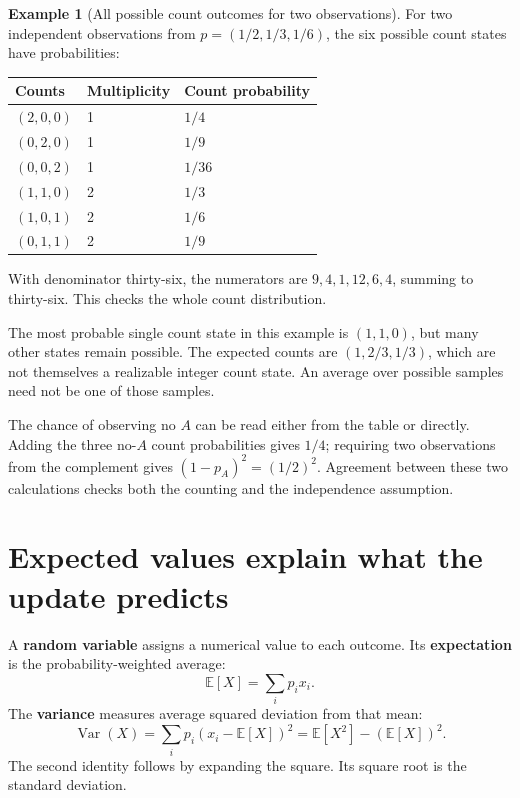\documentclass[11pt,oneside,openany]{book}
\theoremstyle{definition}
\newtheorem{example}{Example}[chapter]
\theoremstyle{remark}
\numberwithin{equation}{chapter}
\begin{document}
\begin{example}[All possible count outcomes for two observations]

For two independent observations from \(p=(1/2,1/3,1/6)\), the six possible count states have probabilities:

\begin{longtable}[]{@{}lll@{}}
\toprule\noalign{}
Counts & Multiplicity & Count probability \\
\midrule\noalign{}
\endhead
\bottomrule\noalign{}
\endlastfoot
\((2,0,0)\) & 1 & \(1/4\) \\
\((0,2,0)\) & 1 & \(1/9\) \\
\((0,0,2)\) & 1 & \(1/36\) \\
\((1,1,0)\) & 2 & \(1/3\) \\
\((1,0,1)\) & 2 & \(1/6\) \\
\((0,1,1)\) & 2 & \(1/9\) \\
\end{longtable}

With denominator thirty-six, the numerators are \(9,4,1,12,6,4\), summing to thirty-six. This checks the whole count distribution.

\end{example}

The most probable single count state in this example is \((1,1,0)\), but many other states remain possible. The expected counts are \((1,2/3,1/3)\), which are not themselves a realizable integer count state. An average over possible samples need not be one of those samples.

The chance of observing no \(A\) can be read either from the table or directly. Adding the three no-\(A\) count probabilities gives \(1/4\); requiring two observations from the complement gives \((1-p_A)^2=(1/2)^2\). Agreement between these two calculations checks both the counting and the independence assumption.

\section{Expected values explain what the update predicts}\label{ch04-expected-values-explain-what-the-update-predicts}

A \textbf{random variable} assigns a numerical value to each outcome. Its \textbf{expectation} is the probability-weighted average: \[\mathbb E[X]=\sum_i p_ix_i.\] The \textbf{variance} measures average squared deviation from that mean: \[\operatorname{Var}(X)=\sum_i p_i(x_i-\mathbb E[X])^2
=\mathbb E[X^2]-(\mathbb E[X])^2.\] The second identity follows by expanding the square. Its square root is the standard deviation.
\end{document}
